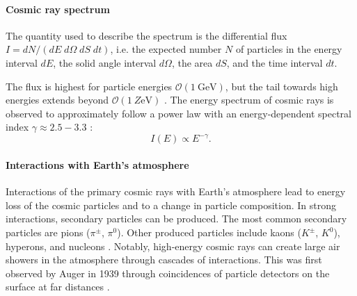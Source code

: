 \paragraph{Cosmic ray spectrum}
The quantity used to describe the spectrum is the differential flux $I=dN/(dE\; d\Omega\; dS\; dt)$, i.e. the expected number $N$ of particles in the energy interval $dE$, the solid angle interval $d\Omega$, the area $dS$, and the time interval $dt$. 
\par The flux is highest for particle energies $\mathcal{O}(\SI{1}{\giga\electronvolt})$, but the tail towards high energies extends beyond $\mathcal{O}(\SI{1}{Z\electronvolt})$ \cite{PDG2024}. The energy spectrum of cosmic rays is observed to approximately follow a power law with an energy-dependent spectral index $\gamma\approx 2.5-3.3$ \cite{PDG2024}:
\begin{equation}
    I(E)\propto E^{-\gamma}.
    \label{eq:Cosmics-Flux}
\end{equation}
\paragraph{Interactions with Earth's atmosphere}
Interactions of the primary cosmic rays with Earth's atmosphere lead to energy loss of the cosmic particles and to a change in particle composition. In strong interactions, secondary particles can be produced. The most common secondary particles are pions ($\pi^\pm$, $\pi^0$). Other produced particles include kaons ($K^\pm$, $K^0$), hyperons, and nucleons \cite{Book-Grieder}. Notably, high-energy cosmic rays can create large air showers in the atmosphere through cascades of interactions. This was first observed by Auger in 1939 through coincidences of particle detectors on the surface at far distances \cite{Cosmics-Auger}.

